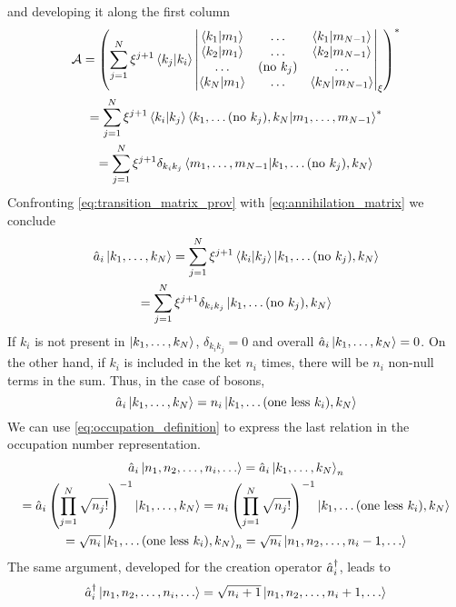 and developing it along the first column
\begin{multline}
    \label{eq:transition_matrix_prov}
    \mathcal{A} = \left( \sum_{j=1}^N \xi^{j+1} \braket{k_j}{k_i}
    \begin{vmatrix}
        \braket{k_1}{m_1} & \dots            & \braket{k_1}{m_{N-1} } \\
        \braket{k_2}{m_1} & \dots            & \braket{k_2}{m_{N-1}}  \\
        \dots             & (\text{no } k_j) & \dots                  \\
        \braket{k_N}{m_1} & \dots            & \braket{k_N}{m_{N-1}}  \\
    \end{vmatrix}_\xi
    \right)^*
    \\ = \sum_{j=1}^N \xi^{j+1} \braket{k_i}{k_j}  \bra{k_1, \dots (\text{no } k_j), k_N} \ket{m_1, \dots, m_{N-1}}^*
    \\ = \sum_{j=1}^N \xi^{j+1} \delta_{k_ik_j}  \bra{m_1, \dots, m_{N-1}} \ket{k_1, \dots (\text{no } k_j), k_N}
\end{multline}
Confronting \cref{eq:transition_matrix_prov} with \cref{eq:annihilation_matrix} we conclude
\begin{multline} \label{eq:annihilation_operator}
    \hat{a}_i \ket{k_1, \dots, k_N}
    = \sum_{j=1}^N \xi^{j+1} \braket{k_i}{k_j} \ket{k_1, \dots (\text{no } k_j), k_N}
    \\= \sum_{j=1}^N \xi^{j+1} \delta_{k_ik_j} \ket{k_1, \dots (\text{no } k_j), k_N}
\end{multline}
If $k_i$ is not present in $\ket{k_1, \dots, k_N}$, $\delta_{k_ik_j} = 0$ and overall $ \hat{a}_i \ket{k_1, \dots, k_N} = 0$. On the other hand, if $k_i$ is included in the ket $n_i$ times, there will be $n_i$ non-null terms in the sum. Thus, in the case of bosons,
\begin{equation}
    \hat{a}_i \ket{k_1, \dots, k_N} = n_i \ket{k_1, \dots (\text{one less }k_i), k_N}
\end{equation}
We can use \cref{eq:occupation_definition} to express the last relation in the occupation number representation.
\begin{multline}
    \hat{a}_i \ket{n_1, n_2, \dots, n_i, \dots} =
    \hat{a}_i \ket{k_1, \dots, k_N}_n
    \\ = \hat{a}_i \left( \prod_{j=1}^N \sqrt{n_j!} \right)^{-1} \ket{k_1, \dots, k_N}
    = n_i \left( \prod_{j=1}^N \sqrt{n_j!} \right)^{-1} \ket{k_1, \dots (\text{one less }k_i), k_N}
    \\ = \sqrt{n_i} \ket{k_1, \dots (\text{one less }k_i), k_N}_n = \sqrt{n_i} \ket{n_1, n_2, \dots, n_i-1, \dots}
\end{multline}
The same argument, developed for the creation operator $\hat{a}_i^\dagger$, leads to
\begin{equation}
    \hat{a}_i^\dagger \ket{n_1, n_2, \dots, n_i, \dots} = \sqrt{n_i+1} \ket{n_1, n_2, \dots, n_i+1, \dots}
\end{equation}

